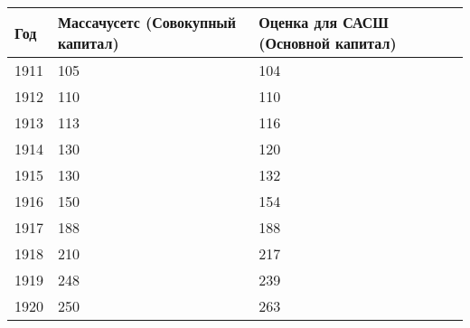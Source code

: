 \documentclass[leqno]{article}  %
\begin{document}
\begin{table}
\centering
\footnotesize{
\begin{tabular}{p{}|p{}|p{}}
\hline
Год & Массачусетс (Совокупный капитал) & Оценка для САСШ (Основной капитал) \\ \hline
1911 & \hfill 105 \hspace*{1cm} & \hfill 104 \hspace*{1cm} \\
1912 & \hfill 110 \hspace*{1cm} & \hfill 110 \hspace*{1cm} \\
1913 & \hfill 113 \hspace*{1cm} & \hfill 116 \hspace*{1cm} \\
1914 & \hfill 130 \hspace*{1cm} & \hfill 120 \hspace*{1cm} \\
1915 & \hfill 130 \hspace*{1cm} & \hfill 132 \hspace*{1cm} \\
1916 & \hfill 150 \hspace*{1cm} & \hfill 154 \hspace*{1cm} \\
1917 & \hfill 188 \hspace*{1cm} & \hfill 188 \hspace*{1cm} \\
1918 & \hfill 210 \hspace*{1cm} & \hfill 217 \hspace*{1cm} \\
1919 & \hfill 248 \hspace*{1cm} & \hfill 239 \hspace*{1cm} \\
1920 & \hfill 250 \hspace*{1cm} & \hfill 263 \hspace*{1cm} \\ \hline
\end{tabular}
}
\end{table}
\end{document}
